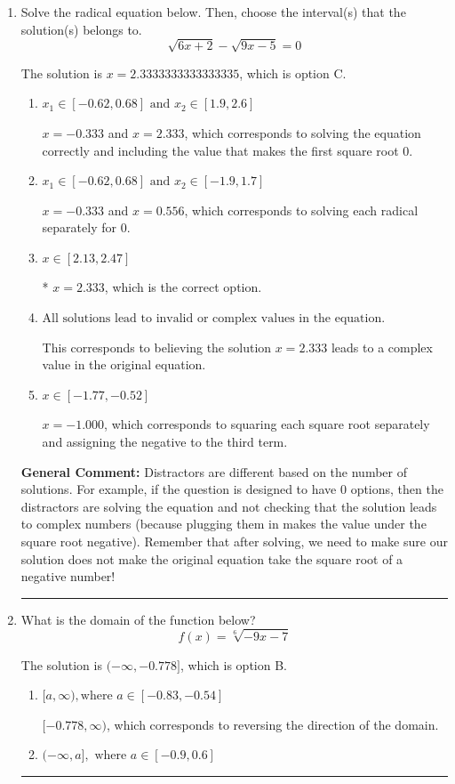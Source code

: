 \documentclass{extbook}[14pt]
\newcommand{\litem}[1]{\item #1

\rule{\textwidth}{0.4pt}}
\begin{document}
\begin{enumerate}\litem{
Solve the radical equation below. Then, choose the interval(s) that the solution(s) belongs to.
\[ \sqrt{6 x + 2} - \sqrt{9 x - 5} = 0 \]

The solution is \( x = 2.3333333333333335 \), which is option C.\begin{enumerate}[label=\Alph*.]
\item \( x_1 \in [-0.62, 0.68] \text{ and } x_2 \in [1.9,2.6] \)

$x = -0.333$ and $x = 2.333$, which corresponds to solving the equation correctly and including the value that makes the first square root 0.
\item \( x_1 \in [-0.62, 0.68] \text{ and } x_2 \in [-1.9,1.7] \)

$x = -0.333$ and $x = 0.556$, which corresponds to solving each radical separately for 0.
\item \( x \in [2.13,2.47] \)

* $x = 2.333$, which is the correct option.
\item \( \text{All solutions lead to invalid or complex values in the equation.} \)

This corresponds to believing the solution $x = 2.333$ leads to a complex value in the original equation.
\item \( x \in [-1.77,-0.52] \)

$x = -1.000$, which corresponds to squaring each square root separately and assigning the negative to the third term.
\end{enumerate}

\textbf{General Comment:} Distractors are different based on the number of solutions. For example, if the question is designed to have 0 options, then the distractors are solving the equation and not checking that the solution leads to complex numbers (because plugging them in makes the value under the square root negative). Remember that after solving, we need to make sure our solution does not make the original equation take the square root of a negative number!
}
\litem{
What is the domain of the function below?
\[ f(x) = \sqrt[6]{-9 x - 7} \]

The solution is \( (-\infty, -0.778] \), which is option B.\begin{enumerate}[label=\Alph*.]
\item \( [a, \infty), \text{where } a \in [-0.83, -0.54] \)

 $[-0.778, \infty)$, which corresponds to reversing the direction of the domain.
\item \( (-\infty, a], \text{ where } a \in [-0.9, 0.6] \)


\end{enumerate}}
\end{enumerate}
\end{document}
